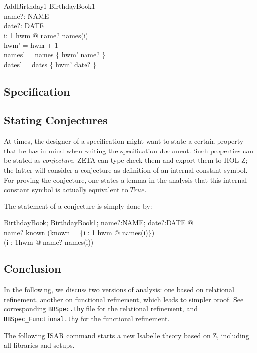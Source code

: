 \begin{schema}{AddBirthday1}
  \Delta BirthdayBook1 \\
  name?: NAME \\
  date?: DATE \\
  \where
  \forall i: 1 \upto hwm @ name? \neq names(i) \\
  hwm' = hwm + 1 \\
  names' = names \oplus \{ hwm' \mapsto name? \} \\
  dates' = dates \oplus \{ hwm' \mapsto date? \}
\end{schema}


\subsection{Specification}
\subsection{Stating Conjectures}
At times, the designer of a specification might want to state
a certain property that he has in mind when writing the specification
document. Such properties can be stated as \emph{conjecture}. ZETA
can type-check them and export them to HOL-Z; the latter will
consider a conjecture as definition of an internal constant symbol.
For proving the conjecture, one states a lemma in the analysis that
this internal constant symbol is actually equivalent to $True$.

The statement of a conjecture is simply done by:

\begin{zed}
 \forall BirthdayBook; BirthdayBook1; name?:NAME; date?:DATE @  \\
    name? \notin known \land (known = \{i : 1 \upto hwm @ names(i)\}) \\
    \implies (\forall i : 1\upto hwm @ name? \neq names(i))
\end{zed}


\subsection{Conclusion}
In the following, we discuss two versions of analysis: one based on relational refinement,
another on functional refinement, which leads to simpler proof.
See corresponding \verb+BBSpec.thy+ file for the relational refinement,
and \verb+BBSpec_Functional.thy+ for the functional refinement.

The following ISAR command starts a new Isabelle 
theory based on Z, including all libraries and setups. 

